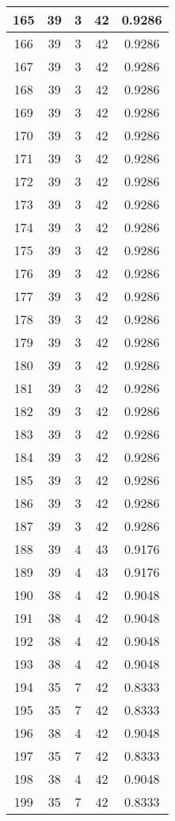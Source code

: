 \documentclass[letterpaper, 12pt]{article}
\begin{document}
\begin{longtable}{|c|c|c|c|c|}
\hline
165 & 39 & 3 & 42 & 0.9286 \\
\hline
166 & 39 & 3 & 42 & 0.9286 \\
\hline
167 & 39 & 3 & 42 & 0.9286 \\
\hline
168 & 39 & 3 & 42 & 0.9286 \\
\hline
169 & 39 & 3 & 42 & 0.9286 \\
\hline
170 & 39 & 3 & 42 & 0.9286 \\
\hline
171 & 39 & 3 & 42 & 0.9286 \\
\hline
172 & 39 & 3 & 42 & 0.9286 \\
\hline
173 & 39 & 3 & 42 & 0.9286 \\
\hline
174 & 39 & 3 & 42 & 0.9286 \\
\hline
175 & 39 & 3 & 42 & 0.9286 \\
\hline
176 & 39 & 3 & 42 & 0.9286 \\
\hline
177 & 39 & 3 & 42 & 0.9286 \\
\hline
178 & 39 & 3 & 42 & 0.9286 \\
\hline
179 & 39 & 3 & 42 & 0.9286 \\
\hline
180 & 39 & 3 & 42 & 0.9286 \\
\hline
181 & 39 & 3 & 42 & 0.9286 \\
\hline
182 & 39 & 3 & 42 & 0.9286 \\
\hline
183 & 39 & 3 & 42 & 0.9286 \\
\hline
184 & 39 & 3 & 42 & 0.9286 \\
\hline
185 & 39 & 3 & 42 & 0.9286 \\
\hline
186 & 39 & 3 & 42 & 0.9286 \\
\hline
187 & 39 & 3 & 42 & 0.9286 \\
\hline
188 & 39 & 4 & 43 & 0.9176 \\
\hline
189 & 39 & 4 & 43 & 0.9176 \\
\hline
190 & 38 & 4 & 42 & 0.9048 \\
\hline
191 & 38 & 4 & 42 & 0.9048 \\
\hline
192 & 38 & 4 & 42 & 0.9048 \\
\hline
193 & 38 & 4 & 42 & 0.9048 \\
\hline
194 & 35 & 7 & 42 & 0.8333 \\
\hline
195 & 35 & 7 & 42 & 0.8333 \\
\hline
196 & 38 & 4 & 42 & 0.9048 \\
\hline
197 & 35 & 7 & 42 & 0.8333 \\
\hline
198 & 38 & 4 & 42 & 0.9048 \\
\hline
199 & 35 & 7 & 42 & 0.8333 \\
\hline
\end{longtable}
\end{document}
